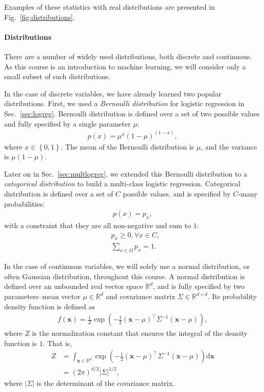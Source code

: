 \documentclass{report}
\newcommand{\vect}[1]{\mathbf{#1}}
\newcommand{\vx}[0]{\vect{x}}
\newcommand{\RR}[0]{\mathbb{R}}
\newcommand{\dd}[1]{\ensuremath{\mbox{d}#1}}
\begin{document}
Examples of these statistics with real distributions are presented in
Fig.~\ref{fig:distributions}. 


\paragraph{Distributions}

There are a number of widely used distributions, both discrete and continuous.
As this course is an introduction to machine learning, we will consider only a
small subset of such distributions. 

In the case of discrete variables, we have already learned two popular
distributions. First, we used a {\it Bernoulli distribution} for logistic
regression in Sec.~\ref{sec:logreg}. Bernoulli distribution is defined over a
set of two possible values and fully specified by a single parameter $\mu$:
\begin{align*}
    p(x) = \mu^x (1-\mu)^(1-x),
\end{align*}
where $x \in \left\{ 0, 1\right\}$. The mean of the Bernoulli distribution is
$\mu$, and the variance is $\mu (1-\mu)$. 

Later on in Sec.~\ref{sec:multlogreg}, we extended this Bernoulli distribution
to a {\it categorical distribution} to build a multi-class logistic regression.
Categorical distribution is defined over a set of $C$ possible values, and is
specified by $C$-many probabilities:
\begin{align*}
    p(x) = p_x,
\end{align*}
with a constraint that they are all non-negative and sum to $1$:
\begin{align*}
    &p_x \geq 0, \forall x \in C, \\
    &\sum_{x \in \Omega} p_x = 1.
\end{align*}

In the case of continuous variables, we will solely use a normal distribution,
or often Gaussian distribution, throughout this course. A normal distribution is
defined over an unbounded real vector space $\RR^d$, and is fully specified by
two parameters--mean vector $\mu \in \RR^d$ and covariance matrix $\Sigma \in
\RR^{d\times d}$. Its probability density function is defined as
\begin{align}
    \label{eq:gauss_pdf}
    f(\vx) = \frac{1}{Z} \exp\left( 
        -\frac{1}{2} (\vx - \mu)^\top \Sigma^{-1} (\vx - \mu)
    \right),
\end{align}
where $Z$ is the normalization constant that ensures the integral of the density
function is $1$. That is,
\begin{align*}
    Z &= \int_{\vx \in \RR^d} \exp\left( 
        -\frac{1}{2} (\vx - \mu)^\top \Sigma^{-1} (\vx - \mu)
    \right) \dd \vx \\
    &= (2\pi)^{d/2} |\Sigma|^{1/2},
\end{align*}
where $|\Sigma|$ is the determinant of the covariance matrix.
\end{document}
